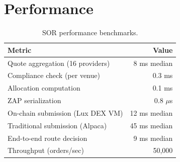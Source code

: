 \section{Performance}
\label{sec:performance}

\begin{table}[H]
\centering
\caption{SOR performance benchmarks.}
\label{tab:benchmarks}
\begin{tabular}{lr}
\toprule
\textbf{Metric} & \textbf{Value} \\
\midrule
Quote aggregation (16 providers) & 8 ms median \\
Compliance check (per venue) & 0.3 ms \\
Allocation computation & 0.1 ms \\
ZAP serialization & 0.8 $\mu$s \\
On-chain submission (Lux DEX VM) & 12 ms median \\
Traditional submission (Alpaca) & 45 ms median \\
End-to-end route decision & 9 ms median \\
Throughput (orders/sec) & 50,000 \\
\bottomrule
\end{tabular}
\end{table}


